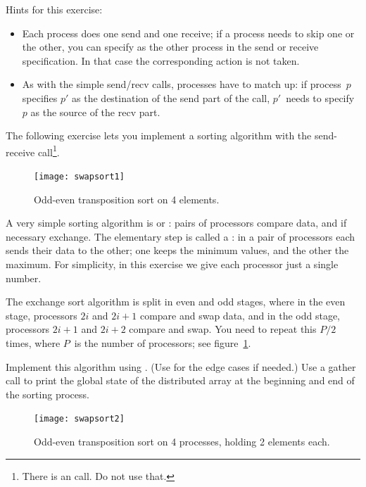 Hints for this exercise:
\begin{itemize}
\item Each process does one send and one receive; if a process needs
  to skip one or the other, you can specify
   as the other process in the send or
  receive specification. In that case the corresponding action
  is not taken.
\item As with the simple send/recv calls, processes have to match up:
  if process~$p$ specifies $p'$ as the destination of the send part of
  the call, $p'$~needs to specify $p$ as the source of the recv part.
\end{itemize}

The following exercise lets you implement a sorting algorithm with the
send-receive call\footnote {There is an 
  call. Do not use that.}.

\begin{figure}[ht]
  \texttt{[image: swapsort1]}
  \caption{Odd-even transposition sort on 4 elements.}
  \label{fig:swapsort1}
\end{figure}

\begin{exercise}
  \label{ex:exchangesort}
  A very simple sorting algorithm is  or
  :
  pairs of processors compare data, and if necessary exchange. The
  elementary step is called a : in a pair
  of processors each sends their data to the other; one keeps the
  minimum values, and the other the maximum.
  For simplicity, in this exercise we give each processor just a single number.

  The exchange sort algorithm is split in even and odd stages, where
  in the even stage, processors $2i$ and $2i+1$ compare and swap data,
  and in the odd stage, processors $2i+1$ and $2i+2$ compare and swap.
  You need to repeat this $P/2$ times, where $P$~is the number of
  processors; see figure~\ref{fig:swapsort1}.

  Implement this algorithm using . (Use
   for the edge cases if needed.)
  Use a gather call to print the global state of the distributed array
  at the beginning and end of the sorting process.
\end{exercise}

\begin{figure}[ht]
  \texttt{[image: swapsort2]}
  \caption{Odd-even transposition sort on 4 processes, holding 2 elements each.}
  \label{fig:swapsort2}
\end{figure}

